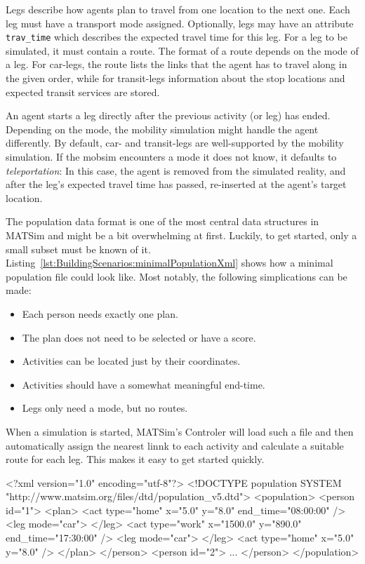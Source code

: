 Legs describe how agents plan to travel from one location to the next one. Each
leg must have a transport mode assigned. Optionally, legs may have an
attribute {\tt trav\_time} which describes the expected travel time for this
leg. For a leg to be simulated, it must contain a route. The format of a
route depends on the mode of a leg. For car-legs, the route lists the links that
the agent has to travel along in the given order, while for transit-legs
information about the stop locations and expected transit services are stored.

An agent starts a leg directly after the previous activity (or leg) has ended.
Depending on the mode, the mobility simulation might handle the agent
differently. By default, car- and transit-legs are well-supported by the
mobility simulation. If the mobsim encounters a mode it does not know, it
defaults to \emph{teleportation}: In this case, the agent is removed from the
simulated reality, and after the leg's expected travel time has passed,
re-inserted at the agent's target location.

\bigskip

The population data format is one of the most central data structures in
MATSim and might be a bit overwhelming at first. Luckily, to get started, only a
small subset must be known of it.
Listing~\ref{lst:BuildingScenarios:minimalPopulationXml} shows how a minimal
population file could look like. Most notably, the following simplications can
be made:
\begin{itemize}\styleItemize
  \item Each person needs exactly one plan.
  \item The plan does not need to be selected or have a score.
  \item Activities can be located just by their coordinates.
  \item Activities should have a somewhat meaningful end-time.
  \item Legs only need a mode, but no routes.
\end{itemize}
When a simulation is started, MATSim's Controler will load such a file and then
automatically assign the nearest linnk to each activity and calculate a suitable
route for each leg. This makes it easy to get started quickly.

\begin{xml-file}[caption=Minimal population.xml required to start MATSim,
label=lst:BuildingScenarios:minimalPopulationXml]
<?xml version="1.0" encoding="utf-8"?>
<!DOCTYPE population SYSTEM "http://www.matsim.org/files/dtd/population_v5.dtd">
<population>
	<person id="1">
		<plan>
			<act type="home" x="5.0" y="8.0" end_time="08:00:00" />
			<leg mode="car">
			</leg>
			<act type="work" x="1500.0" y="890.0" end_time="17:30:00" />
			<leg mode="car">
			</leg>
			<act type="home" x="5.0" y="8.0" />
		</plan>
	</person>
	<person id="2">
		...
	</person>
</population>
\end{xml-file}

